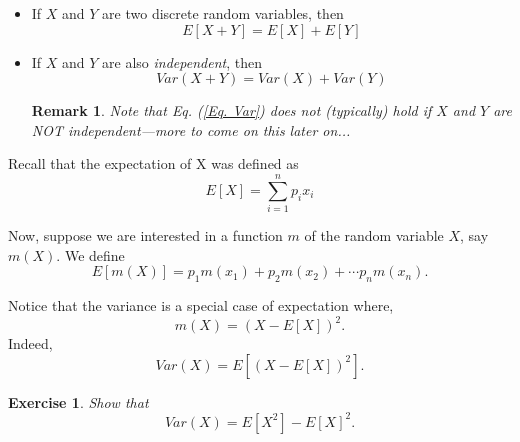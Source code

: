 \documentclass[smaller, handout]{beamer}\usepackage[]{graphicx}\usepackage[]{color}
\newtheorem{remark}{Remark}[section]
\newtheorem{exercise}{Exercise}[section]
\newenvironment{stepitemize}{\begin{itemize}[<+->]}{\end{itemize} }
\begin{document}
\begin{frame}{\secname}%


\begin{stepitemize}
\item If $X$ and $Y$ are two discrete random variables, then%
\begin{equation*}
E\left[ X+Y\right] =E\left[ X\right] +E\left[ Y\right]
\end{equation*}

\item If $X$ and $Y$ are also \emph{independent}, then%
\begin{equation}
Var\left( X+Y\right) =Var\left( X\right) +Var\left( Y\right) \label{Eq. Var}
\end{equation}

\begin{remark}
Note that Eq. (\ref{Eq. Var})  does not (typically) hold if $X$ and $Y$ are NOT independent---more to come on this later on...
\end{remark}
\end{stepitemize}

\end{frame}%

\begin{frame}{\secname}%

Recall that the expectation of X was defined as
\begin{equation*}
E\left[ X\right] = \sum_{i=1}^{n} p_i x_i
\end{equation*}

Now, suppose we are interested in a function $m$ of the random variable $X$, say $m(X)$. We define
\begin{equation*}
E\left[ m\left( X\right) \right] =p_{1}m\left( x_{1}\right) +p_{2}m\left(
x_{2}\right) +\cdots p_{n}m\left( x_{n}\right).
\end{equation*}

Notice that the variance is a special case of expectation where,
\begin{equation*}
m(X)=(X-E\left[ X\right] )^{2}.
\end{equation*}
Indeed,
\begin{equation*}
Var\left( X\right) =E\left[ (X-E\left[ X\right] )^{2}\right].
\end{equation*}

\begin{exercise}
Show that
\begin{equation*}
Var\left( X\right) =E\left[ X^{2}\right] -E\left[ X\right] ^{2}.
\end{equation*}
\end{exercise}

\end{frame}
\end{document}
